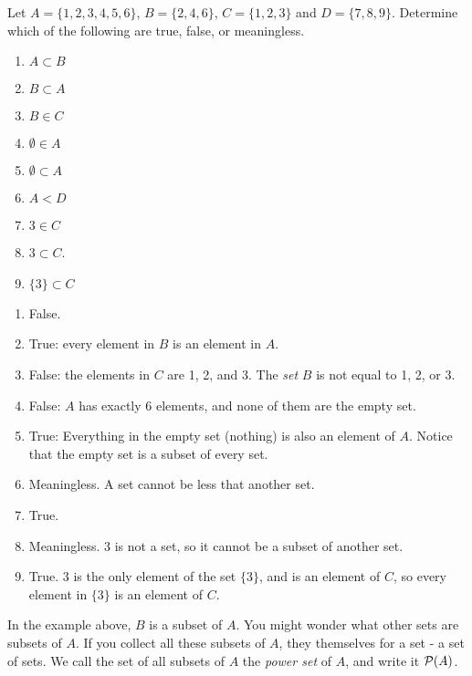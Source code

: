 \documentclass[12pt]{article}
\begin{document}
\begin{example}
 Let $A = \{1, 2, 3, 4, 5, 6\}$, $B = \{2, 4, 6\}$, $C = \{1, 2, 3\}$ and $D = \{7, 8, 9\}$.  Determine which of the following are true, false, or meaningless.
\begin{multicols}{3}
\begin{enumerate}
\item $A \subset B$
\item $B \subset A$
\item $B \in C$
\item $\emptyset \in A$
\item $\emptyset \subset A$
\item $A < D$
\item $3 \in C$
\item $3 \subset C$.
\item $\{3\} \subset C$
\end{enumerate}
\end{multicols}
\begin{solution}
 \begin{enumerate}
  \item False.
\item True: every element in $B$ is an element in $A$.
\item False: the elements in $C$ are 1, 2, and 3.  The {\em set} $B$ is not equal to 1, 2, or 3.
\item False: $A$ has exactly 6 elements, and none of them are the empty set.
\item True: Everything in the empty set (nothing) is also an element of $A$.  Notice that the empty set is a subset of every set.
\item Meaningless.  A set cannot be less that another set.
\item True.
\item Meaningless.  $3$ is not a set, so it cannot be a subset of another set.
\item True.  $3$ is the only element of the set $\{3\}$, and is an element of $C$, so every element in $\{3\}$ is an element of $C$.
 \end{enumerate}
\end{solution}
\end{example}

In the example above, $B$ is a subset of $A$.  You might wonder what other sets are subsets of $A$.  If you collect all these subsets of $A$, they themselves for a set - a set of sets.  We call the set of all subsets of $A$ the {\em power set} of $A$, and write it $\mathcal P(A)$.  
\end{document}

